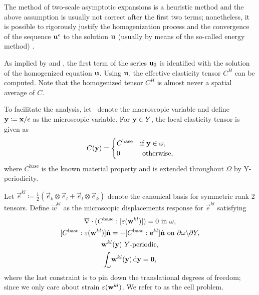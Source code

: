 \documentclass[twocolumn,10pt]{article}
\begin{document}
The method of two-scale asymptotic expansions is a heuristic method
and the above assumption is usually not correct after the first two
terms; nonetheless, it is possible to rigorously justify the
homogenization process and the convergence of the sequence $\mathbf u^\epsilon$ to
the solution $\mathbf u$ (usually by means of the so-called energy method)
\cite{allaire2002shape, allaire1992homogenization}.

As implied by  and , the
first term of the series $\mathbf u_0$ is identified with the solution of the
homogenized equation $\mathbf u$. Using $\mathbf u$, the effective elasticity tensor
$C^H$ can be computed. Note that the homogenized tensor $C^H$ is
almost never a spatial average of $C$.

To facilitate the analysis, let \x\ denote the macroscopic variable
and define $\mathbf y\coloneqq \mathbf x/\epsilon$ as the microscopic variable. For ${\mathbf y}
\in Y$, the local elasticity tensor is given as
\begin{equation}
  \label{eqn:microC}
  C(\mathbf y) = \begin{cases} C^\text{base} & \text{if } \mathbf y
    \in \omega, \\ 0 & \text{ otherwise,} \end{cases}
\end{equation}
where $C^\text{base}$ is the known material property and is extended
throughout $\Omega$ by Y-periodicity.

Let $\vec{e}^{kl} \coloneqq \frac{1}{2} \left(\vec{e}_k \otimes
\vec{e}_l + \vec{e}_l \otimes \vec{e}_k \right)$ denote the canonical
basis for symmetric rank 2 tensors. Define $\vec{w}^{kl}$ as the
microscopic displacements response for $\vec{e}^{kl}$ satisfying
\begin{subequations}
  \label{set:cell}
  \begin{gather}
    \nabla \cdot (C^\text{base} : [\strain({\bf w}^{kl})]) = 0 \text{ in } \omega, \\
    [C^\text{base} : \strain({\bf w}^{kl})]\hat{\vec{n}}  =  - [C^\text{base} : \vec{e}^{kl}]\hat{\vec{n}} \text{ on } \partial \omega \backslash \partial Y, \\
    {\bf w}^{kl}({\y})\ Y\text{-periodic}, \\
    \int_\omega \! {\bf w}^{kl}({\y})  \, \mathrm{d} {\y} =  {\bf 0},
  \end{gather}
\end{subequations}
where the last constraint is to pin down the translational degrees of
freedom; since we only care about strain $\varepsilon(\mathbf w^{kl})$.  We
refer to  as the cell problem.
\end{document}
